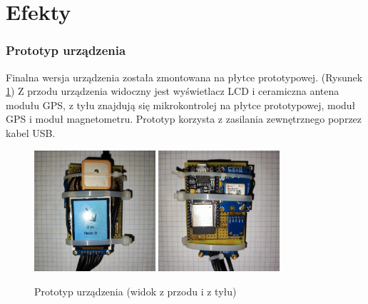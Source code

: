 \part{Efekty}

\section{Prototyp urządzenia}
Finalna wersja urządzenia została zmontowana na płytce prototypowej. (Rysunek \ref{fig:device})
Z przodu urządzenia widoczny jest wyświetlacz LCD i ceramiczna antena modułu GPS, z tyłu znajdują się mikrokontrolej na płytce prototypowej, moduł GPS i moduł magnetometru.
Prototyp korzysta z zasilania zewnętrznego poprzez kabel USB.

\begin{figure}[h]
    \centering
    \includegraphics[width=0.4\textwidth]{res/front.jpg}
    \includegraphics[width=0.4\textwidth]{res/back.jpg}
    \caption{Prototyp urządzenia (widok z przodu i z tyłu)}
    \label{fig:device}
\end{figure}

